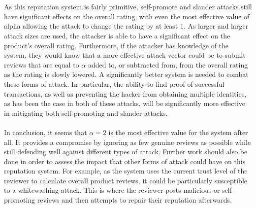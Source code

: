 \documentclass{article}
\begin{document}
\\\\
As this reputation system is fairly primitive, self-promote and slander attacks still have significant effects on the overall rating, with even the most effective value of alpha allowing the attack to change the rating by at least 1. As larger and larger attack sizes are used, the attacker is able to have a significant effect on the product's overall rating. Furthermore, if the attacker has knowledge of the system, they would know that a more effective attack vector could be to submit reviews that are equal to $\alpha$ added to, or subtracted from, from the overall rating as the rating is slowly lowered. A significantly better system is needed to combat these forms of attack. In particular, the ability to find proof of successful transactions, as well as preventing the hacker from obtaining multiple identities, as has been the case in both of these attacks, will be significantly more effective in mitigating both self-promoting and slander attacks.\cite{attack_defense}
\\\\
In conclusion, it seems that $\alpha = 2$ is the most effective value for the system after all. It provides a compromise by ignoring as few genuine reviews as possible while still defending well against different types of attack.
Further work should also be done in order to assess the impact that other forms of attack could have on this reputation system.
For example, as the system uses the current trust level of the reviewer to calculate overall product reviews, it could be particularly susceptible to a whitewashing attack. This is where the reviewer posts malicious or self-promoting reviews and then attempts to repair their reputation afterwards\cite{attack_defense}.

\newpage
\raggedright
{}

\newpage
\end{document}
